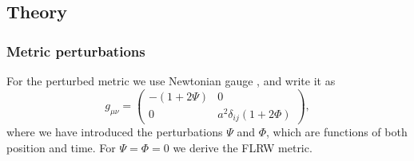 \subsection{Theory}\label{ssec:M3:theory}
\subsubsection{Metric perturbations}\label{ssec:M3:theory}
For the perturbed metric we use Newtonian gauge , and write it as  
\begin{equation}
    g_{\mu\nu} = 
    \begin{pmatrix}
        -(1+2\Psi) & 0 \\
        0 & a^2 \delta_{ij}(1+2\Phi)
    \end{pmatrix},
\end{equation}
where we have introduced the perturbations $\Psi$ and $\Phi$, which are functions of both position and time. For $\Psi=\Phi=0$ we derive the FLRW metric. 